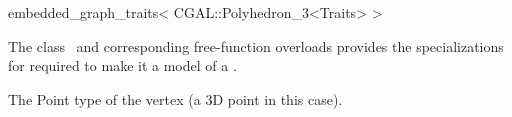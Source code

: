 

\begin{ccRefClass}{embedded_graph_traits< CGAL::Polyhedron_3<Traits> >}


\ccDefinition

The class \ccRefName\ and corresponding free-function overloads 
provides the specializations for  
required to make it a model of a .


\ccTypes
  {The Point type of the vertex (a 3D point in this case).}

\ccIsModel
{}

\ccSeeAlso

\end{ccRefClass}



